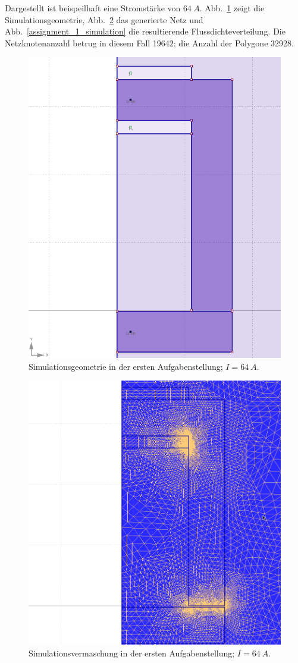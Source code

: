 \documentclass[conference,a4paper,twoside]{IEEEtran}
\begin{document}
Dargestellt ist beispeilhaft eine Stromstärke von $64\ A$. Abb.~\ref{assignment_1_geometry} zeigt die Simulationsgeometrie, Abb.~\ref{assignment_1_mesh} das generierte Netz und Abb.~\ref{assignment_1_simulation} die resultierende Flussdichteverteilung. Die Netzknotenanzahl betrug in diesem Fall 19642; die Anzahl der Polygone 32928.

\begin{figure}
\centerline{\includegraphics[width=0.7\columnwidth]{../assets/assignment_1_geometry.png}}
\caption{Simulationsgeometrie in der ersten Aufgabenstellung; $I = 64\ A$.}
\label{assignment_1_geometry}
\end{figure}

\begin{figure}
\centerline{\includegraphics[width=0.7\columnwidth]{../assets/assignment_1_mesh.png}}
\caption{Simulationsvermaschung in der ersten Aufgabenstellung; $I = 64\ A$.}
\label{assignment_1_mesh}
\end{figure}
\end{document}
